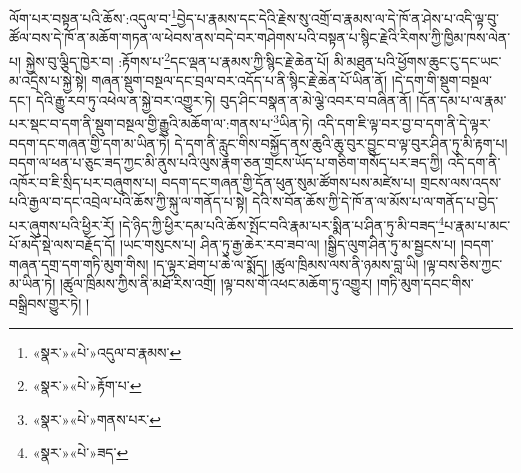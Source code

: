 ལོག་པར་བསྟན་པའི་ཆོས་:འདུལ་བ་\footnote{«སྣར་»«པེ་»འདུལ་བ་རྣམས་}བྱེད་པ་རྣམས་དང་དེའི་རྗེས་སུ་འགྲོ་བ་རྣམས་ལ་དེ་ཁོ་ན་ཤེས་པ་འདི་ལྟ་བུ་ཚོལ་བས་དེ་ཁོ་ན་མཆོག་གཏན་ལ་ཕེབས་ནས་བདེ་བར་གཤེགས་པའི་བསྟན་པ་སྙིང་རྗེའི་རིགས་ཀྱི་ཁྱིམ་ཁས་ལེན་པ། སྐྱེས་བུ་ལྕིད་ཁྱེར་བ། :རྟོགས་པ་\footnote{«སྣར་»«པེ་»རྟོག་པ་}དང་ལྡན་པ་རྣམས་ཀྱི་སྙིང་རྗེ་ཆེན་པོ། མི་མཐུན་པའི་ཕྱོགས་ཆུང་ངུ་དང་ཡང་མ་འདྲེས་པ་སྐྱེ་སྟེ། གཞན་སྡུག་བསྔལ་དང་བྲལ་བར་འདོད་པ་ནི་སྙིང་རྗེ་ཆེན་པོ་ཡིན་ནོ། །དེ་དག་གི་སྡུག་བསྔལ་དང་། དེའི་རྒྱུ་རབ་ཏུ་འཕེལ་ན་སྐྱེ་བར་འགྱུར་ཏེ། བུད་ཤིང་བསྣན་ན་མེ་ལྕེ་འབར་བ་བཞིན་ནོ། །དོན་དམ་པ་ལ་རྣམ་པར་སྡང་བ་དག་ནི་སྡུག་བསྔལ་གྱི་རྒྱུའི་མཆོག་ལ་:གནས་པ་\footnote{«སྣར་»«པེ་»གནས་པར་}ཡིན་ཏེ། འདི་དག་ཇི་ལྟ་བར་བྱ་བ་དག་ནི་དེ་ལྟར་བདག་དང་གཞན་གྱི་དག་མ་ཡིན་ཏེ། དེ་དག་ནི་རླུང་གིས་བསྐྱོད་ནས་ཆུའི་ཆུ་བུར་བྱུང་བ་ལྟ་བུར་ཤིན་ཏུ་མི་རྟག་པ། བདག་ལ་ཕན་པ་ཅུང་ཟད་ཀྱང་མི་ནུས་པའི་ལུས་རྣག་ཅན་གྲངས་ཡོད་པ་གཅིག་གསོད་པར་ཟད་ཀྱི། འདི་དག་ནི་འཁོར་བ་ཇི་སྲིད་པར་བཞུགས་པ། བདག་དང་གཞན་གྱི་དོན་ཕུན་སུམ་ཚོགས་པས་མཛེས་པ། གྲངས་ལས་འདས་པའི་རྒྱལ་བ་དང་འབྲེལ་པའི་ཆོས་ཀྱི་སྐུ་ལ་གནོད་པ་སྟེ། དེའི་ས་བོན་ཆོས་ཀྱི་དེ་ཁོ་ན་ལ་མོས་པ་ལ་གནོད་པ་བྱེད་པར་ཞུགས་པའི་ཕྱིར་རོ། །དེ་ཉིད་ཀྱི་ཕྱིར་དམ་པའི་ཆོས་སྤོང་བའི་རྣམ་པར་སྨིན་པ་ཤིན་ཏུ་མི་བཟད་\footnote{«སྣར་»«པེ་»ཟད་}པ་རྣམ་པ་མང་པོ་མདོ་སྡེ་ལས་བརྗོད་དོ། །ཡང་གསུངས་པ། ཤིན་ཏུ་རྒྱ་ཆེར་རབ་ཟབ་ལ། །སྒྱིད་ལུག་ཤིན་ཏུ་མ་སྦྱངས་པ། །བདག་གཞན་དགྲ་དག་གཏི་མུག་གིས། །ད་ལྟར་ཐེག་པ་ཆེ་ལ་སྨོད། །ཚུལ་ཁྲིམས་ལས་ནི་ཉམས་བླ་ཡི། །ལྟ་བས་ཅིས་ཀྱང་མ་ཡིན་ཏེ། །ཚུལ་ཁྲིམས་ཀྱིས་ནི་མཐོ་རིས་འགྲོ། །ལྟ་བས་གོ་འཕང་མཆོག་ཏུ་འགྱུར། །གཏི་མུག་དབང་གིས་བསྒྲིབས་གྱུར་ཏེ། །
